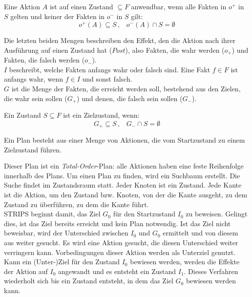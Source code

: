\begin{definition}
    Eine Aktion $A$ ist auf einen Zustand $\subseteq F$ anwendbar, wenn alle Fakten in $o^+$ in $S$ gelten und keiner der Fakten in $o^-$ in $S$ gilt:\\
    \[o^+(A) \subseteq S\,,\;\;\;o^-(A) \cap S =\emptyset\]
\end{definition}
Die letzten beiden Mengen beschreiben den Effekt, den die Aktion nach ihrer Ausführung auf einen Zustand hat ($Post$), also Fakten, die wahr werden ($o_+$) und Fakten, die falsch werden ($o_-$).\\
$I$ beschreibt, welche Fakten anfangs wahr oder falsch sind.
Eine Fakt $f\in F$ ist anfangs wahr, wenn $f\in I$ und sonst falsch.\\
$G$ ist die Menge der Fakten, die erreicht werden soll, bestehend aus den Zielen, die wahr sein sollen ($G_+$) und denen, die falsch sein sollen ($G_-$).
\begin{definition}
    Ein Zustand $S\subseteq F$  ist ein Zielzustand, wenn:
    \[G_+\subseteq S\,,\;\;\;G_-\cap S =\emptyset\]
\end{definition}
\begin{definition}
    Ein Plan besteht aus einer Menge von Aktionen, die vom Startzustand zu einem Zielzustand führen.
\end{definition}

Dieser Plan ist ein \emph{Total-Order}-Plan: alle Aktionen haben eine feste Reihenfolge innerhalb des Plans.
Um einen Plan zu finden, wird ein Suchbaum erstellt.
Die Suche findet im Zustandsraum statt.
Jeder Knoten ist ein Zustand.
Jede Kante ist die Aktion, um den Zustand bzw. Knoten, von der die Kante ausgeht, zu dem Zustand zu überführen, zu dem die Kante führt.\\
\ac{STRIPS} beginnt damit, das Ziel $G_0$ für den Startzustand $I_0$ zu beweisen.
Gelingt dies, ist das Ziel bereits erreicht und kein Plan notwendig.
Ist das Ziel nicht beweisbar, wird der Unterschied zwischen $I_0$ und $G_0$ ermittelt und von diesem aus weiter gesucht.
Es wird eine Aktion gesucht, die diesen Unterschied weiter verringern kann.
Vorbedingungen dieser Aktion werden als Unterziel genutzt.
Kann ein (Unter-)Ziel für den Zustand $I_0$ bewiesen werden, werden die Effekte der Aktion auf $I_0$ angewandt und es entsteht ein Zustand $I_1$.
Dieses Verfahren wiederholt sich bis ein Zustand entsteht, in dem das Ziel $G_0$ bewiesen werden kann.
